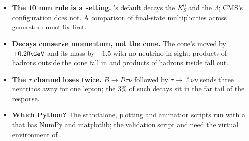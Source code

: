 \begin{pitfalls}
\begin{itemize}[nosep]
    transverse momentum is a vector sum over the event, and forward
    neutrinos contribute little to it; the loss to a jet is the
    neutrino's \pt in the cone, not the event's \ptmiss.
  \item \textbf{The 10 mm rule is a setting.} \PYTHIA's default decays the
    $K_S^0$ and the $\Lambda$; CMS's configuration does not. A comparison
    of final-state multiplicities across generators must fix
     first.
  \item \textbf{Decays conserve momentum, not the cone.} The cone's \pt
    moved by $+0.20\GeV$ and its mass by $-1.5$ with no neutrino in sight;
    products of hadrons outside the cone fall in and products of hadrons
    inside fall out.
  \item \textbf{The $\tau$ channel loses twice.} $B\to D\tau\nu$ followed
    by $\tau\to\ell\nu\nu$ sends three neutrinos away for one lepton; the
    $3\%$ of such decays sit in the far tail of the response.
  \item \textbf{Which Python?} The standalone, plotting and animation
    scripts run with a  that has NumPy and matplotlib; the
    validation script and  need the virtual
    environment of .
\end{itemize}
\end{pitfalls}


